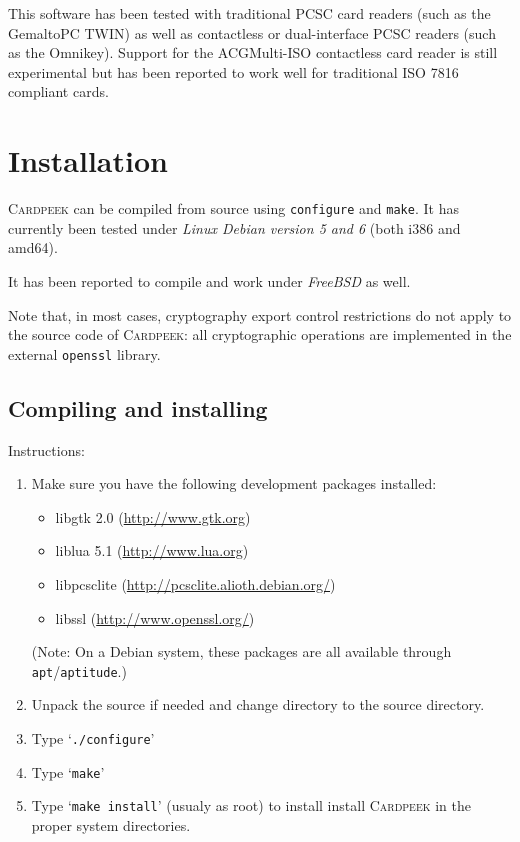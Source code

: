 \documentclass[11pt]{report}
\newcommand{\Cardpeek}{\textsc{Cardpeek}}
\begin{document}
This software has been tested with traditional PCSC card readers (such as the Gemalto\texttrademark PC TWIN) 
as well as contactless or dual-interface PCSC readers (such as the Omnikey). 
Support for the ACG\texttrademark Multi-ISO contactless card reader is still experimental but has been 
reported to work well for traditional ISO 7816 compliant cards.

\tableofcontents

\chapter{Installation}

\Cardpeek{} can be compiled from source using \texttt{configure} and \texttt{make}.
It has currently been tested under \emph{Linux Debian version 5 and 6} (both i386 and amd64).

It has been reported to compile and work under \emph{FreeBSD} as well.

Note that, in most cases, cryptography export control restrictions do not apply to the source code
of \Cardpeek: all cryptographic operations are implemented in the external \texttt{openssl} 
library.

\section{Compiling and installing}

Instructions:
\begin{enumerate}
\item{Make sure you have the following development packages installed:
  \begin{itemize}
  \item{libgtk 2.0 (\url{http://www.gtk.org})}
  \item{liblua 5.1 (\url{http://www.lua.org})}
  \item{libpcsclite (\url{http://pcsclite.alioth.debian.org/})}
  \item{libssl (\url{http://www.openssl.org/})}
  \end{itemize}
(Note: On a Debian system, these packages are all available through \texttt{apt}/\texttt{aptitude}.)}
\item{Unpack the source if needed and change directory to the source directory.}
\item{Type `\texttt{./configure}'}
\item{Type `\texttt{make}'}
\item{Type `\texttt{make install}' (usualy as root) to install install \Cardpeek{} in the proper system directories. }
\end{enumerate}
\end{document}
